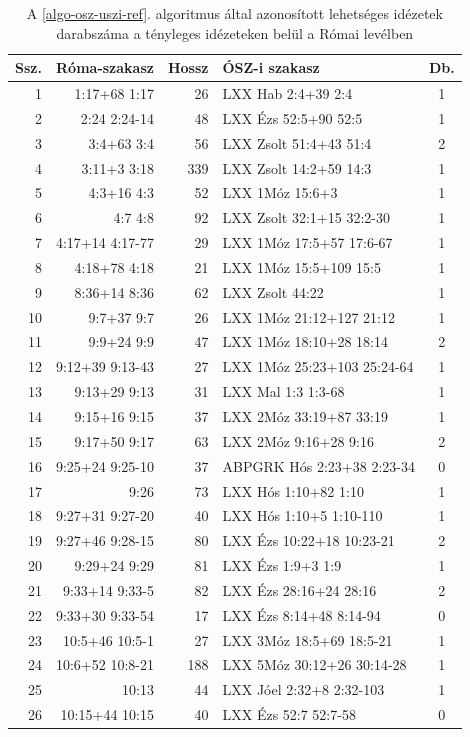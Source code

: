 \documentclass{article}
\begin{document}
\begin{longtable}{rrrlc}
\caption{A \ref{algo-osz-uszi-ref}. algoritmus által azonosított lehetséges idézetek darabszáma
a tényleges idézeteken belül a Római levélben} \label{tab:Rom-darabszam}\\
{\bf Ssz.}&{\bf Róma-szakasz}&{\bf Hossz}&{\bf ÓSZ-i szakasz}&{\bf Db.}\\
\hline
\endfirsthead
1& 1:17+68 1:17&26&LXX Hab 2:4+39 2:4&1\\
2& 2:24 2:24-14&48&LXX Ézs 52:5+90 52:5&1\\
3& 3:4+63 3:4&56&LXX Zsolt 51:4+43 51:4&2\\
4& 3:11+3 3:18&339&LXX Zsolt 14:2+59 14:3&1\\
5& 4:3+16 4:3&52&LXX 1Móz 15:6+3&1\\
6& 4:7 4:8&92&LXX Zsolt 32:1+15 32:2-30&1\\
7& 4:17+14 4:17-77&29&LXX 1Móz 17:5+57 17:6-67&1\\
8& 4:18+78 4:18&21&LXX 1Móz 15:5+109 15:5&1\\
9& 8:36+14 8:36&62&LXX Zsolt 44:22&1\\
10& 9:7+37 9:7&26&LXX 1Móz 21:12+127 21:12&1\\
11& 9:9+24 9:9&47&LXX 1Móz 18:10+28 18:14&2\\
12& 9:12+39 9:13-43&27&LXX 1Móz 25:23+103 25:24-64&1\\
13& 9:13+29 9:13&31&LXX Mal 1:3 1:3-68&1\\
14& 9:15+16 9:15&37&LXX 2Móz 33:19+87 33:19&1\\
15& 9:17+50 9:17&63&LXX 2Móz 9:16+28 9:16&2\\
16& 9:25+24 9:25-10&37&ABPGRK Hós 2:23+38 2:23-34&0\\
17& 9:26&73&LXX Hós 1:10+82 1:10&1\\
18& 9:27+31 9:27-20&40&LXX Hós 1:10+5 1:10-110&1\\
19& 9:27+46 9:28-15&80&LXX Ézs 10:22+18 10:23-21&2\\
20& 9:29+24 9:29&81&LXX Ézs 1:9+3 1:9&1\\
21& 9:33+14 9:33-5&82&LXX Ézs 28:16+24 28:16&2\\
22& 9:33+30 9:33-54&17&LXX Ézs 8:14+48 8:14-94&0\\
23& 10:5+46 10:5-1&27&LXX 3Móz 18:5+69 18:5-21&1\\
24& 10:6+52 10:8-21&188&LXX 5Móz 30:12+26 30:14-28&1\\
25& 10:13&44&LXX Jóel 2:32+8 2:32-103&1\\
26& 10:15+44 10:15&40&LXX Ézs 52:7 52:7-58&0\\

\end{longtable}
\end{document}
